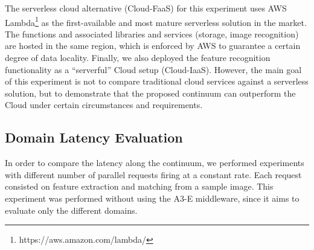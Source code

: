 


The serverless cloud alternative (Cloud-FaaS) for this experiment uses AWS Lambda\footnote{https://aws.amazon.com/lambda/} as the first-available and most mature serverless solution in the market. The functions and associated libraries and services (storage, image recognition) are hosted in the same region, which is enforced by AWS to guarantee a certain degree of data locality. Finally, we also deployed the feature recognition functionality as a ``serverful'' Cloud setup (Cloud-IaaS). However, the main goal of this experiment is not to compare traditional cloud services against a serverless solution, but to demonstrate that the proposed continuum can outperform the Cloud under certain circumstances and requirements.


\subsection{Domain Latency Evaluation} 

In order to compare the latency along the continuum, we performed experiments with different number of parallel requests firing at a constant rate. Each request consisted on feature extraction and matching from a sample image. This experiment was performed without using the A3-E middleware, since it aims to evaluate only the different domains.

